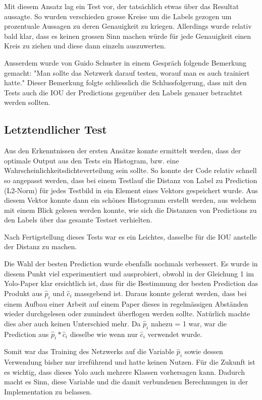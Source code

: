 Mit diesem Ansatz lag ein Test vor, der tatsächlich etwas über das Resultat aussagte. 
So wurden verschieden grosse Kreise um die Labels gezogen um prozentuale Aussagen zu deren Genauigkeit zu kriegen.
Allerdings wurde relativ bald klar, dass es keinen grossen Sinn machen würde für jede Genauigkeit einen Kreis zu ziehen und diese dann einzeln auszuwerten.

Ausserdem wurde von Guido Schuster \cite{PrivateCommunication} in einem Gespräch folgende Bemerkung gemacht:
"Man sollte das Netzwerk darauf testen, worauf man es auch trainiert hatte."
Dieser Bemerkung folgte schliesslich die Schlussfolgerung, dass mit den Tests auch die IOU der Predictions gegenüber den Labels genauer betrachtet werden sollten.

\subsection{Letztendlicher Test}
\label{chapter:letztendlicher_test}
Aus den Erkenntnissen der ersten Ansätze konnte ermittelt werden, dass der optimale Output aus den Tests ein Histogram, bzw. eine Wahrscheinlichkeitsdichteverteilung sein sollte.
So konnte der Code relativ schnell so angepasst werden, dass bei einem Testlauf die Distanz von Label zu Prediction (L2-Norm) für jedes Testbild in ein Element eines Vektors gespeichert wurde.
Aus diesem Vektor konnte dann ein schönes Histogramm erstellt werden, aus welchem mit einem Blick gelesen werden konnte, wie sich die Distanzen von Predictions zu den Labels über das gesamte Testset verhielten.

Nach Fertigstellung dieses Tests war es ein Leichtes, dasselbe für die IOU anstelle der Distanz zu machen. 

Die Wahl der besten Prediction wurde ebenfalls nochmals verbessert.
Es wurde in diesem Punkt viel experimentiert und ausprobiert, obwohl in der Gleichung 1 im Yolo-Paper \cite{yolo} klar ersichtlich ist, dass für die Bestimmung der besten Prediction das Produkt aus $\hat{p}_i$ und $\hat{c}_i$ massgebend ist.
Daraus konnte gelernt werden, dass bei einem Aufbau einer Arbeit auf einem Paper dieses in regelmässigen Abständen wieder durchgelesen oder zumindest überflogen werden sollte.
Natürlich machte dies aber auch keinen Unterschied mehr.
Da $\hat{p}_i$ nahezu = 1 war, war die Prediction aus $\hat{p}_i * \hat{c}_i$ dieselbe wie wenn nur $\hat{c}_i$ verwendet wurde.

Somit war das Training des Netzwerks auf die Variable $\hat{p}_i$ sowie dessen Verwendung bisher nur irreführend und hatte keinen Nutzen.
Für die Zukunft ist es wichtig, dass dieses Yolo auch mehrere Klassen vorhersagen kann.
Dadurch macht es Sinn, diese Variable und die damit verbundenen Berechnungen in der Implementation zu belassen. 


